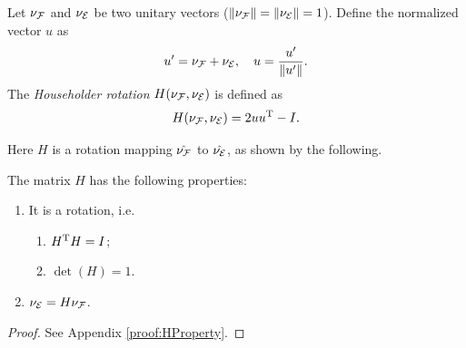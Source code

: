 \documentclass[10pt,twocolumn,twoside]{IEEEtran}
\begin{document}
  \begin{definition} Let $\nu_{\mathcal{F}}$ and $\nu_{\mathcal{E}}$ be two unitary vectors ($\lVert\nu_{\mathcal{F}}\rVert=\lVert\nu_{\mathcal{E}}\rVert=1$). Define the normalized vector $u$ as
    \begin{equation}
      u'=\nu_{\mathcal{F}}+\nu_{\mathcal{E}},\quad u =\frac{u'}{\lVert u'\rVert}.
    \end{equation}
    The \emph{Householder rotation} $H(\nu_{\mathcal{F}},\nu_{\mathcal{E}})$ is defined as
    \begin{equation}\label{eq:H definition}
      H(\nu_{\mathcal{F}},\nu_{\mathcal{E}}) = 2 u u^\mathrm{T}-I.
    \end{equation}
  \end{definition}
  Here $H$ is a rotation mapping $\hat{\nu_{\mathcal{F}}}$ to $\hat{\nu_{\mathcal{E}}}$, as shown by the following.
  \begin{proposition}\label{prop:HProperty}
    The matrix $H$ has the following properties:
    \begin{enumerate}
    \item It is a rotation, i.e.
      \begin{enumerate}
      \item\label{it:orthonormality} $H^\mathrm{T} H=I$;
      \item\label{it:determinant} $\det(H)=1$.
      \end{enumerate}
    \item\label{it:transformation} $\nu_{\mathcal{E}}=H \nu_{\mathcal{F}}$.
    \end{enumerate}
  \end{proposition}
  \begin{proof}
  	See Appendix \ref{proof:HProperty}.
  \end{proof}
\end{document}
